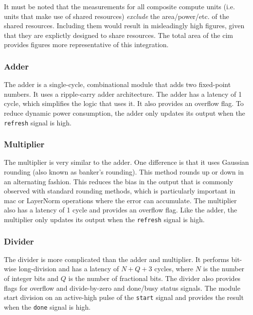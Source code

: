 It must be noted that the measurements for all composite compute units (i.e. units that make use of shared resources) \textit{exclude} the area/power/etc. of the shared resources.
Including them would result in misleadingly high figures, given that they are explictly designed to share resources. The total area of the \ac{cim} provides figures more representative
of this integration.

\subsubsection{Adder}
The adder is a single-cycle, combinational module that adds two fixed-point numbers. It uses a ripple-carry adder architecture. The adder has a latency of 1 cycle, which simplifies the
logic that uses it. It also provides an overflow flag. To reduce dynamic power consumption, the adder only updates its output when the \texttt{refresh} signal is high.

\subsubsection{Multiplier}
The multiplier is very similar to the adder. One difference is that it uses Gaussian rounding (also known as banker's rounding). This method rounds up or down in an alternating fashion.
This reduces the bias in the output that is commonly observed with standard rounding methods, which is particularly important in \ac{mac} or LayerNorm operations where the error can
accumulate. The multiplier also has a latency of 1 cycle and provides an overflow flag. Like the adder, the multiplier only updates its output when the \texttt{refresh} signal is high.

\subsubsection{Divider}
The divider is more complicated than the adder and multiplier. It performs bit-wise long-division and has a latency of $N+Q+3$ cycles, where $N$ is the number of integer bits and $Q$ is
the number of fractional bits. The divider also provides flags for overflow and divide-by-zero and done/busy status signals. The module start division on an active-high pulse of the \texttt{start}
signal and provides the result when the \texttt{done} signal is high.

